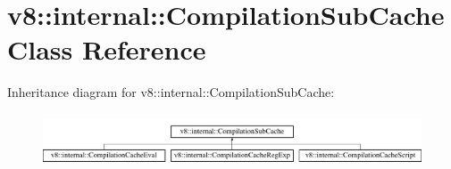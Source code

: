 \hypertarget{classv8_1_1internal_1_1CompilationSubCache}{}\section{v8\+:\+:internal\+:\+:Compilation\+Sub\+Cache Class Reference}
\label{classv8_1_1internal_1_1CompilationSubCache}
Inheritance diagram for v8\+:\+:internal\+:\+:Compilation\+Sub\+Cache\+:\begin{figure}[H]
\begin{center}
\leavevmode
\includegraphics[height=1.602289cm]{classv8_1_1internal_1_1CompilationSubCache}
\end{center}
\end{figure}

